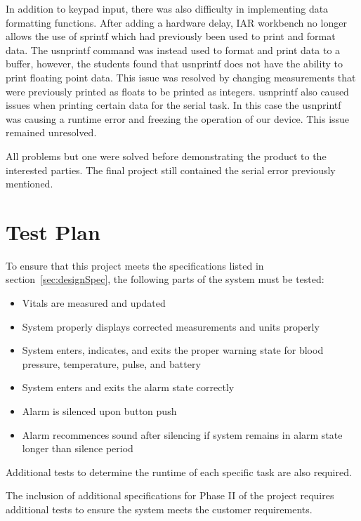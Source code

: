 \documentclass[12pt]{article} %
\begin{document}
    In addition to keypad input, there was also difficulty in implementing data
    formatting functions. After adding a hardware delay, IAR workbench no
    longer allows the use of sprintf which had previously been used to print
    and format data. The usnprintf command was instead used to format and print
    data to a buffer, however, the students found that usnprintf does not have
    the ability to print floating point data. This issue was resolved by
    changing measurements that were previously printed as floats to be printed
    as integers. usnprintf also caused issues when printing certain data for
    the serial task. In this case the usnprintf was causing a runtime error and
    freezing the operation of our device. This issue remained unresolved. 
    
    
    
    
    All problems but one were solved before demonstrating the product to the interested
    parties. The final project still contained the serial error previously mentioned.
    
    \section{Test Plan} 

    To ensure that this project meets the specifications listed in 
    section~\ref{sec:designSpec}, the following parts of the system must be 
    tested: 

    \begin{itemize}
      \item Vitals are measured and updated
      \item System properly displays corrected measurements and units properly
      \item System enters, indicates, and exits the proper warning state for
	blood pressure, temperature, pulse, and battery
      \item System enters and exits the alarm state correctly
      \item Alarm is silenced upon button push
      \item Alarm recommences sound after silencing if system remains in alarm
	state longer than silence period
    \end{itemize}

    Additional tests to determine the runtime of each specific task are also
    required.

    The inclusion of additional specifications for Phase II of the project
    requires additional tests to ensure the system meets the customer
    requirements.
\end{document}
